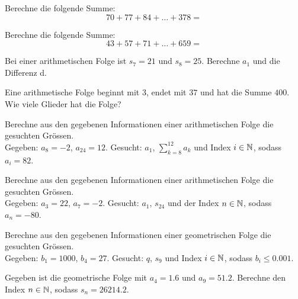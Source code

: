 \documentclass[11pt]{exam}
\begin{document}
\begin{questions}


\question[4] %
Berechne die folgende Summe: \[70+77+84+\ldots+378=\]

\question[4]
Berechne die folgende Summe: \[43+57+71+\ldots+659=\]

\question[4]
Bei einer arithmetischen Folge ist $s_7=21$ und $s_8=25$. Berechne $a_1$ und die Differenz d.


\question[4] %
Eine arithmetische Folge beginnt mit $3$, endet mit $37$ und hat die Summe $400$. Wie viele Glieder hat die Folge?

\question[4] %
Berechne aus den gegebenen Informationen einer arithmetischen Folge die gesuchten Grössen.\\
Gegeben: $a_8=-2$, $a_{24}=12$. Gesucht: $a_1$, $\sum_{k=8}^{12} a_k$ und Index $i\in\mathbb{N}$, sodass $a_i=82$.


\question[4] %
Berechne aus den gegebenen Informationen einer arithmetischen Folge die gesuchten Grössen.\\
Gegeben: $a_3=22$, $a_{7}=-2$. Gesucht: $a_1$, $s_{24}$ und der Index $n\in\mathbb{N}$, sodass $a_n=-80$.

\question[3] %
Berechne aus den gegebenen Informationen einer geometrischen Folge die gesuchten Grössen.\\
Gegeben: $b_1=1000$, $b_4=27$. Gesucht: $q$, $s_9$ und Index $i\in\mathbb{N}$, sodass $b_i\leq 0.001$.

\question[3] %
Gegeben ist die geometrische Folge mit $a_4=1.6$ und $a_9=51.2$. Berechne den Index $n\in\mathbb{N}$, sodass $s_n=26214.2$.


\end{questions}
\end{document}

